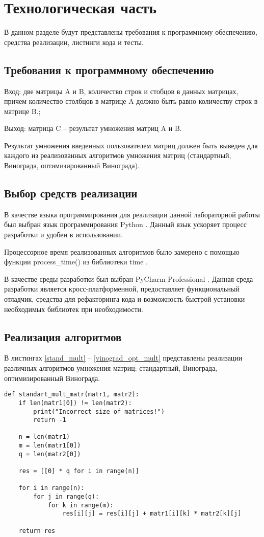 \chapter{Технологическая часть}

В данном разделе будут представлены требования к программному обеспечению, средства реализации, листинги кода и тесты.

\section{Требования к программному обеспечению}
Вход: две матрицы A и B, количество строк и стобцов в данных матрицах, причем количество столбцов в матрице A должно быть равно количеству строк в матрице B.;

Выход: матрица C -- результат умножения матриц A и B.

Результат умножения введенных пользователем матриц должен быть выведен для каждого из реализованных алгоритмов умножения матриц (стандартный, Винограда, оптимизированный Винограда).

\section{Выбор средств реализации}

В качестве языка программирования для реализации данной лабораторной работы был выбран язык программирования Python  \cite{PythonBook}. Данный язык ускоряет процесс разработки и удобен в использовании.

Процессорное время реализованных алгоритмов было замерено с помощью функции process\_time() из библиотеки time \cite{process_time_text}.

В качестве среды разработки был выбран PyCharm Professional \cite{pycharm}. Данная среда разработки является кросс-платформенной, предоставляет функциональный отладчик, средства для рефакторинга кода и возможность быстрой установки необходимых библиотек при необходимости.

\section{Реализация алгоритмов}

В листингах \ref{stand_mult} -- \ref{vinograd_opt_mult} представлены реализации различных алгоритмов умножения матриц: стандартный, Винограда, оптимизированный Винограда.

\begin{lstlisting}[caption=Функция стандартного алгоритма умножения матриц, 
    label={stand_mult}]
def standart_mult_matr(matr1, matr2):
    if len(matr1[0]) != len(matr2):
        print("Incorrect size of matrices!")
        return -1

    n = len(matr1)
    m = len(matr1[0])
    q = len(matr2[0])

    res = [[0] * q for i in range(n)]

    for i in range(n):
        for j in range(q):
            for k in range(m):
                res[i][j] = res[i][j] + matr1[i][k] * matr2[k][j]

    return res
\end{lstlisting}


